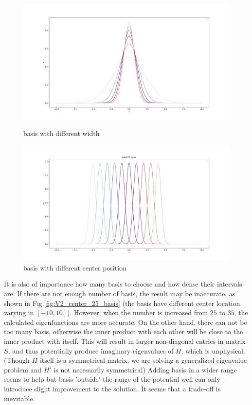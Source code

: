 \documentclass{article}
\begin{document}
\begin{figure}[!htb]
    \centering
    \begin{minipage}{0.5\textwidth}
        \centering
        \includegraphics[width=1\linewidth]{dif_width_5.png}
        \caption{basis with different width}
        \label{fig:dif_width}
    \end{minipage}%
    \begin{minipage}{0.5\textwidth}
        \centering
        \includegraphics[width=1\linewidth]{basis.png}
        \caption{basis with different center position}
        \label{fig:dif_center}
    \end{minipage}
\end{figure}

It is also of importance how many basis to choose and how dense their intervals are. If there are not enough number of basis, the result may be inaccurate, as shown in Fig.\ref{fig:V2_center_25_basis} (the basis have different center location varying in $[-10, 10]$). However, when the number is increased from $25$ to $35$, the calculated eigenfunctions are more accurate. On the other hand, there can not be too many basis, otherwise the inner product with each other will be close to the inner product with itself. This will result in larger non-diagonal entries in matrix $S$, and thus potentially produce imaginary eigenvalues of $H$, which is unphysical. (Though $H$ itself is a symmetrical matrix, we are solving a generalized eigenvalue problem and $H'$ is not necessarily symmetrical) Adding basis in a wider range seems to help but basis 'outside' the range of the potential well can only introduce slight improvement to the solution. It seems that a trade-off is inevitable.
\end{document}
